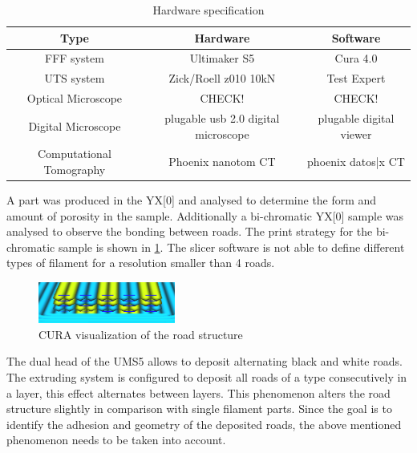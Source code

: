 \begin{table}[h]
	\centering
	\caption{Hardware specification}
	\label{tab:hardware}
	\begin{tabular}{ccc}
		Type  & Hardware & Software    \\
		\hline
		FFF system & Ultimaker S5 & Cura 4.0 \\
		UTS system & Zick/Roell z010 10kN & Test Expert \\
		Optical Microscope & CHECK! & CHECK! \\		
        Digital Microscope & plugable usb 2.0 digital microscope & plugable digital viewer \\
		Computational Tomography & Phoenix nanotom CT  & phoenix datos|x CT \\

	

		\hline
	\end{tabular}
\end{table}

A part was produced in the YX[0] and analysed to determine the form and amount of porosity in the sample. Additionally a bi-chromatic YX[0] sample was analysed to observe the bonding between roads. The print strategy for the bi-chromatic sample is shown in \ref{fig:colorroads}. The slicer software is not able to define different types of filament for a resolution smaller than 4 roads. 

\begin{figure}[htb]
    \centering
    \includegraphics[width=0.4\textwidth]{chapter_4_RVE_Definition/figures/colorroads.PNG}
    \caption{CURA visualization of the road structure}
    \label{fig:colorroads}
\end{figure}

The dual head of the UMS5   allows to deposit alternating black and white roads. The extruding system is configured to deposit all roads of a type consecutively in a layer, this effect alternates between layers. This phenomenon alters the road structure slightly in comparison with single filament parts. Since the goal is to identify the adhesion and geometry of the deposited roads, the above mentioned phenomenon needs to be taken into account.

